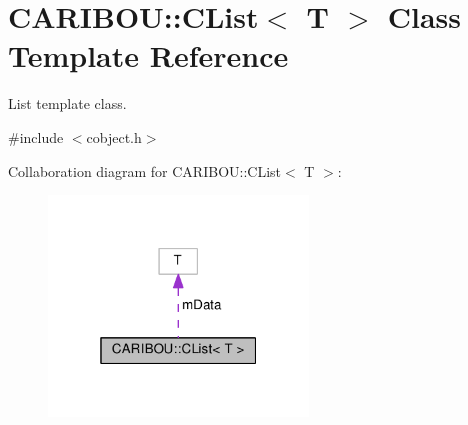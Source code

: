 \section{C\+A\+R\+I\+B\+OU\+:\+:C\+List$<$ T $>$ Class Template Reference}
\label{class_c_a_r_i_b_o_u_1_1_c_list}


List template class.  




{\ttfamily \#include $<$cobject.\+h$>$}



Collaboration diagram for C\+A\+R\+I\+B\+OU\+:\+:C\+List$<$ T $>$\+:\nopagebreak
\begin{figure}[H]
\begin{center}
\leavevmode
\includegraphics[width=196pt]{class_c_a_r_i_b_o_u_1_1_c_list__coll__graph}
\end{center}
\end{figure}
